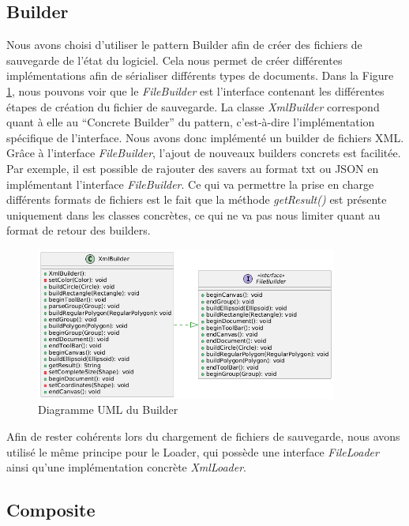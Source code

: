 \documentclass{article}
\begin{document}
\subsection{Builder}
Nous avons choisi d'utiliser le pattern Builder afin de créer des fichiers de sauvegarde de l'état du logiciel. Cela nous permet de créer différentes implémentations
afin de sérialiser différents types de documents. Dans la Figure \ref{Builder}, nous pouvons voir que le \textit{FileBuilder} est l'interface contenant les différentes étapes de création
du fichier de sauvegarde. La classe \textit{XmlBuilder} correspond quant à elle au ``Concrete Builder'' du pattern, c'est-à-dire l'implémentation spécifique
de l'interface. Nous avons donc implémenté un builder de fichiers XML. Grâce à l'interface \textit{FileBuilder}, l'ajout de nouveaux builders concrets est facilitée.
Par exemple, il est possible de rajouter des savers au format txt ou JSON en implémentant l'interface \textit{FileBuilder}.
Ce qui va permettre la prise en charge différents formats de fichiers est le fait que la méthode \textit{getResult()} est présente uniquement dans les classes concrètes, ce qui ne va pas nous
limiter quant au format de retour des builders.

\begin{figure}[h]
    \centering
    \includegraphics[width=\textwidth,height=5.0cm,keepaspectratio]{builder.png}
    \caption{Diagramme UML du Builder}
    \label{Builder}
\end{figure}
\FloatBarrier

Afin de rester cohérents lors du chargement de fichiers de sauvegarde, nous avons utilisé le même principe pour le Loader,
qui possède une interface \textit{FileLoader} ainsi qu'une implémentation concrète \textit{XmlLoader}.

\subsection{Composite}
\end{document}
